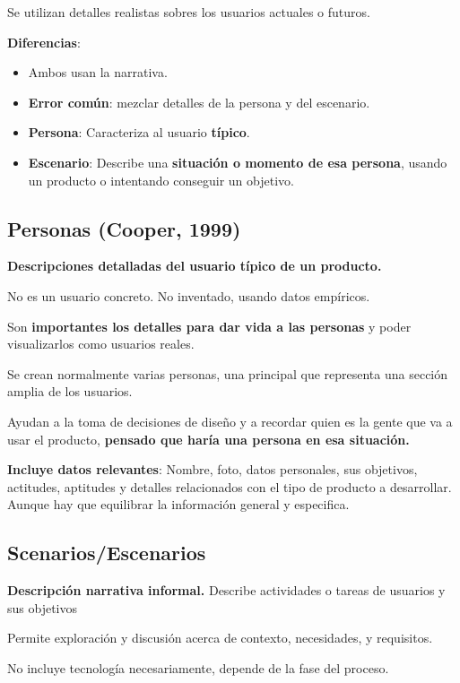\documentclass[12pt]{report} %
\begin{document}
Se utilizan detalles realistas sobres los usuarios actuales o futuros.

\textbf{Diferencias}:

\begin{itemize}

\item
  Ambos usan la narrativa.
\item
  \textbf{Error común}: mezclar detalles de la persona y del escenario.
\item
  \textbf{Persona}: Caracteriza al usuario \textbf{típico}.
\item
  \textbf{Escenario}: Describe una \textbf{situación o momento de esa
  persona}, usando un producto o intentando conseguir un objetivo.
\end{itemize}

\subsection{Personas (Cooper, 1999)}

\textbf{Descripciones detalladas del usuario típico de un producto.}

No es un usuario concreto. No inventado, usando datos empíricos.

Son \textbf{importantes los detalles para dar vida a las personas} y
poder visualizarlos como usuarios reales.

Se crean normalmente varias personas, una principal que representa una
sección amplia de los usuarios.

Ayudan a la toma de decisiones de diseño y a recordar quien es la gente
que va a usar el producto, \textbf{pensado que haría una persona en esa
situación.}

\textbf{Incluye datos relevantes}: Nombre, foto, datos personales, sus
objetivos, actitudes, aptitudes y detalles relacionados con el tipo de
producto a desarrollar. Aunque hay que equilibrar la información general
y especifica.

\subsection{Scenarios/Escenarios}

\textbf{Descripción narrativa informal.} Describe actividades o tareas
de usuarios y sus objetivos

Permite exploración y discusión acerca de contexto, necesidades, y
requisitos.

No incluye tecnología necesariamente, depende de la fase del proceso.
\end{document}
